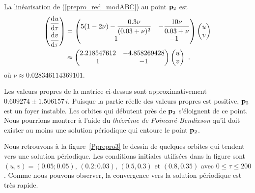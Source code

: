{La linéarisation de (\ref{prepro_red_modABC}) au point $\mathbf{p}_2$ est
\begin{align*}
\begin{pmatrix}
\displaystyle \frac{\mathrm{d}u}{\mathrm{d}\tau} \\[0.7em] \displaystyle \frac{\mathrm{d}v}{\mathrm{d}\tau}
\end{pmatrix} &=
\begin{pmatrix}
\displaystyle 5(1-2\nu) - \frac{0.3\nu}{(0.03+\nu)^2} &
\displaystyle - \frac{10\nu}{0.03+\nu} \\
1 & -1
\end{pmatrix}
\begin{pmatrix}
u \\ v
\end{pmatrix} \\
&\approx
\begin{pmatrix}
2.218547612 &  -4.858269428 \\
1 & -1
\end{pmatrix}
\begin{pmatrix}
u \\ v
\end{pmatrix} \ .
\end{align*}
où $\displaystyle \nu \approx 0.028346114369101$.

Les valeurs propres de la matrice ci-dessus sont approximativement
$0.609274 \pm 1.506157\, i$.  Puisque la partie réelle des valeurs
propres est positive, $\mathbf{p}_2$ est un foyer instable.  Les orbites qui
débutent près de $\mathbf{p}_2$ s'éloignent de ce point.  Nous pourrions
montrer à l'aide du {\em théorème de Poincaré-Bendixson} qu'il doit
exister au moins une solution périodique qui entoure le point
$\mathbf{p}_2$.


Nous retrouvons à la figure~\ref{Pprepro3} le dessin de quelques orbites
qui tendent vers une solution périodique.    Les conditions initiales
utilisées dans la figure sont $(u,v)=(0.05;0.05)$, $(0.2;0.03)$,
$(0.5,0.3)$ et $(0.8, 0.35)$ avec $0 \leq \tau \leq 200$.  Comme nous
pouvons observer, la convergence vers la solution périodique est très
rapide.

}  %




